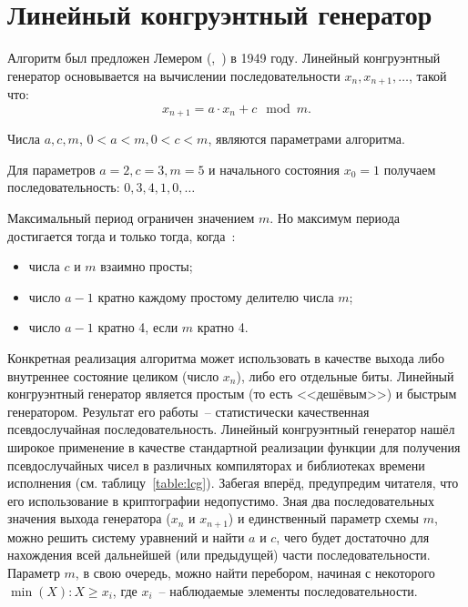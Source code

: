 \section{Линейный конгруэнтный генератор}\label{section-linear-congruential-generator}

Алгоритм был предложен Лемером (,~\cite{Lehmer:1951:1, Lehmer:1951:2}) в 1949 году. Линейный конгруэнтный генератор основывается на вычислении последовательности $x_n, x_{n+1}, \dots$, такой что:
	\[x_{n+1} = a \cdot x_n + c \mod m.\]

Числа $a, c, m$, $ 0 < a < m, 0 < c < m$, являются параметрами алгоритма.

\example
Для параметров $a = 2, c = 3, m = 5$ и начального состояния $x_0 = 1$ получаем последовательность: $0, 3, 4, 1, 0, \dots$
\exampleend

Максимальный период ограничен значением $m$. Но максимум периода достигается тогда и только тогда, когда~\cite[Линейный конгруэнтный метод]{Knuth:2001:2}:

\begin{itemize}
	\item числа $c$ и $m$ взаимно просты;
	\item число $a - 1$ кратно каждому простому делителю числа $m$;
	\item число $a - 1$ кратно 4, если $m$ кратно 4.
\end{itemize}

Конкретная реализация алгоритма может использовать в качестве выхода либо внутреннее состояние целиком (число $x_n$), либо его отдельные биты. Линейный конгруэнтный генератор является простым (то есть <<дешёвым>>) и быстрым генератором. Результат его работы~-- статистически качественная псевдослучайная последовательность. Линейный конгруэнтный генератор нашёл широкое применение в качестве стандартной реализации функции для получения псевдослучайных чисел в различных компиляторах и библиотеках времени исполнения (см. таблицу~\ref{table:lcg}). Забегая вперёд, предупредим читателя, что его использование в криптографии недопустимо. Зная два последовательных значения выхода генератора ($x_n$ и $x_{n+1}$) и единственный параметр схемы $m$, можно решить систему уравнений и найти $a$ и $c$, чего будет достаточно для нахождения всей дальнейшей (или предыдущей) части последовательности. Параметр $m$, в свою очередь, можно найти перебором, начиная с некоторого $\min(X): X \geq x_i$, где $x_i$~-- наблюдаемые элементы последовательности.

